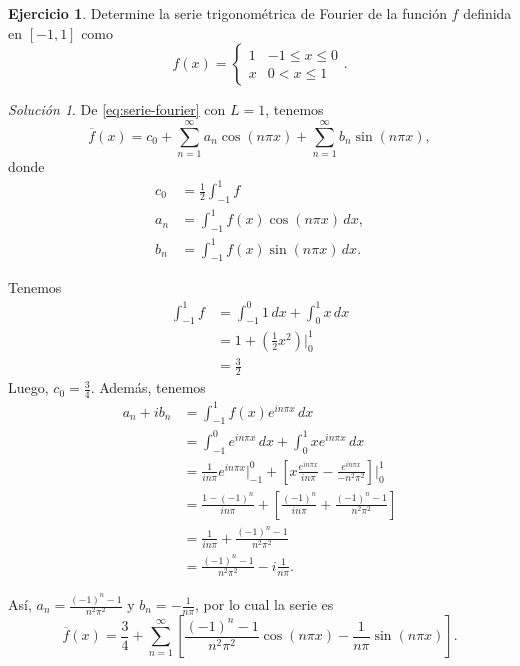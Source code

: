 \documentclass[11pt,letterpaper,draft]{report}
\theoremstyle{plain}
\theoremstyle{definition}
\newtheorem{exercise}[theorem]{Ejercicio}
\theoremstyle{remark}
\newtheorem*{solution}{Solución}
\newcommand\<{\langle}
\renewcommand\>{\rangle}
\begin{document}
\begin{exercise}\label{ejemplo-fourier}
  Determine la serie trigonométrica de Fourier de la función $f$
  definida en $[-1,1]$ como
  \[
    f(x) =
    \begin{cases}
      1 & -1\leq x\leq 0 \\
      x & 0<x\leq 1
    \end{cases}
  .\]
\end{exercise}
\begin{solution}
  De \eqref{eq:serie-fourier} con $L=1$, tenemos
  \[
    \overline{f}(x) = c_0
    + \sum_{n=1}^\infty a_n\cos(n\pi x)
    + \sum_{n=1}^\infty b_n\sin(n\pi x)
  ,\]
  donde
  \begin{align*}
    c_0 &= \frac{1}{2}\int_{-1}^1 f \\
    a_n &= \int_{-1}^1 f(x)\cos(n\pi x)\,dx, \\
    b_n &= \int_{-1}^1 f(x)\sin(n\pi x)\,dx.
  \end{align*}

  Tenemos
  \begin{align*}
    \int_{-1}^{1}f
    &= \int_{-1}^{0}1\,dx + \int_{0}^{1}x\,dx \\
    &= 1 + \left( \frac{1}{2}x^{2} \right)\Big|_{0}^{1} \\
    &= \frac{3}{2}
  \end{align*}
  Luego, $c_0=\frac{3}{4}$.
  Además, tenemos
  \begin{align*}
    a_n+ib_n
    &= \int_{-1}^{1}f(x)e^{in\pi x}\,dx \\
    &= \int_{-1}^{0}e^{in\pi x}\,dx
     + \int_{0}^{1}xe^{in\pi x}\,dx \\
    &= \frac{1}{in\pi}e^{in\pi x}\Big|_{-1}^{0}
     + \left[
       x \frac{e^{in\pi x}}{in\pi}
       -
       \frac{e^{in\pi x}}{-n^{2}\pi^{2}}
     \right]\Big|_{0}^{1} \\
    &= \frac{1-(-1)^{n}}{in\pi}
     + \left[
       \frac{(-1)^{n}}{in\pi}
       + \frac{(-1)^{n}-1}{n^{2}\pi^{2}}
     \right] \\
    &= \frac{1}{in\pi}
     + \frac{(-1)^{n}-1}{n^{2}\pi^{2}} \\
    &=
     \frac{(-1)^{n}-1}{n^{2}\pi^{2}}
     -i \frac{1}{n\pi}.
  \end{align*}

  Así, $a_n=\frac{(-1)^{n}-1}{n^{2}\pi^{2}}$ y $b_n=-\frac{1}{n\pi}$,
  por lo cual la serie es
  \[
    \overline{f}(x)
    =
    \frac{3}{4}
    +
    \sum_{n=1}^{\infty}
    \left[
      \frac{(-1)^{n}-1}{n^{2}\pi^{2}}\cos(n\pi x)
      -\frac{1}{n\pi}\sin(n\pi x)
    \right]
  .\]
    
\end{solution}
\end{document}
